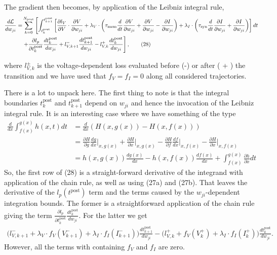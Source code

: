 \documentclass[a4paper]{article}
\newcommand{\blue}[1]{{\color{blue}#1}}
\begin{document}
\blue{The gradient then becomes, by application of the Leibniz
  integral rule,
  \begin{align}
    \frac{d \cal L}{d w_{ji}} = &\sum_{k=0}^{N_{\text{post}}} \left[
      \int_{t_k^{\text{post}}}^{t_{k+1}^{\text{post}}} \left[
        \frac{\partial l_V}{\partial V} \cdot \frac{\partial
          V}{\partial w_{ji}} + \lambda_V \cdot \left(
        \tau_{\text{mem}} \frac{d}{dt} \frac{\partial V}{\partial
          w_{ji}} +\frac{\partial V}{\partial w_{ji}} - \frac{\partial
          I}{\partial w_{ji}}\right) + \lambda_I \cdot
        \left(\tau_{\text{syn}} \frac{d}{dt} \frac{\partial
          I}{\partial w_{ji}} + \frac{\partial I}{\partial w_{ji}}
        \right)\right] dt \right. \nonumber  \\
      & \left. + \frac{\partial l_p}{\partial t_k^{\text{post}}} \frac{d
        t_k^{\text{post}}}{d w_{ji}} + l^-_{V,k+1}
      \frac{dt_{k+1}^{\text{post}}}{d w_{ji}} - l^+_{V,k} \frac{d
        t_k^{\text{post}}}{d w_{ji}} \right], \tag{28}
  \end{align}
  
    where $l^{\pm}_{V,k}$ is the voltage-dependent loss evaluated before (-) or after ( + ) the transition and we have used that
    $f_V = f_I = 0$ along all considered trajectories.
    }

There is a lot to unpack here. The first thing to note is that the
integral boundaries $t_k^{\text{post}}$ and $t_{k+1}^{\text{post}}$
depend on $w_{ji}$ and hence the invocation of the Leibniz integral
rule. It is an interesting case where we have something of the type
\begin{align}
  \frac{d}{dx} \int_{f(x)}^{g(x)} h(x,t) dt &= \frac{d}{dx} \left(H(x,g(x)) - H(x,f(x))\right) \\
  &= \frac{\partial H}{\partial g} \frac{dg}{dx}\Big|_{x,g(x)} + \frac{\partial
    H}{\partial x}\Big|_{x,g(x)} - \frac{\partial H}{\partial f}
  \frac{df}{dx}\Big|_{x,f(x)} - \frac{\partial H}{\partial x}\Big|_{x,f(x)} \\
  &= h(x,g(x))\frac{dg(x)}{dx} - h(x,f(x)) \frac{df(x)}{dx} +
  \int_{f(x)}^{g(x)} \frac{\partial
    h}{\partial x} dt
\end{align}
So, the first row of \blue{(28)} is a straight-forward derivative of
the integrand with application of the chain rule, as well
as using \blue{(27a)} and \blue{(27b)}. That leaves the derivative of the
$l_p(t^{\text{post}})$ term and the terms caused by the
$w_{ji}$-dependent integration bounds. The former is a straightforward
application of the chain 
rule giving the term $\frac{\partial l_p}{\partial t_k^{\text{post}}}
\frac{d t_k^{\text{post}}}{d w_{ji}}$. For the latter we get
\begin{align}
 \big( l^-_{V,k+1}  +\lambda_V \cdot
  f_V(V^-_{k+1}) +\lambda_I \cdot f_I(I^-_{k+1})\big)\frac{dt_{k+1}^{\text{post}}}{d w_{ji}} - \big(l^+_{V,k}
   + f_V(V^+_{k}) + \lambda_I \cdot
  f_I(I^+_{k})\big) \frac{dt_k^{\text{post}}}{d w_{ji}}.  
\end{align}
However, all the terms with containing $f_V$ and $f_I$ are zero.
\end{document}
